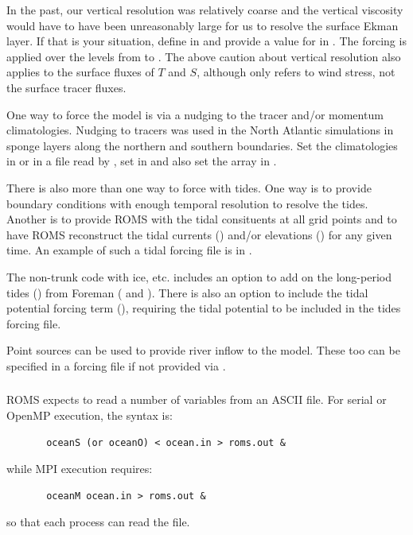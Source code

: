 In the past, our vertical resolution was relatively coarse and the
vertical viscosity would have to have been unreasonably large for
us to resolve the surface Ekman layer.  If that is your situation,
define  in  and provide a value for
 in .  The forcing is applied over the
levels from  to .  The above caution about
vertical resolution also applies to the surface fluxes of $T$ and
$S$, although  only refers to wind stress, not the
surface tracer fluxes.

\smallskip
{}

One way to force the model is via a nudging to the tracer and/or
momentum climatologies. Nudging to tracers was used in the North
Atlantic simulations in sponge layers along the northern and southern
boundaries. Set the climatologies in  or in a
file read by , set  in
 and also set the array  in
.

\smallskip
{}

There is also more than one way to force with tides. One way is to
provide boundary conditions with enough temporal resolution to
resolve the tides. Another is to provide ROMS with the tidal
consituents at all grid points and to have ROMS reconstruct the
tidal currents ()  and/or elevations ()
for any given time. An example of such a tidal forcing file is in
.

The non-trunk code with ice, etc. includes an option to
add on the long-period tides () from Foreman
(\cite{Foreman_96a} and \cite{Foreman_96b}). There is also an option to include the tidal potential
forcing term (), requiring the tidal potential to
be included in the tides forcing file.

\smallskip
{}

Point sources can be used to provide river inflow to the model.
These too can be specified in a forcing file if not provided via
.

\subsubsection{}
\label{ASCII_in}
ROMS expects to read a number of variables from an ASCII file.
For serial or OpenMP execution, the syntax is:
\begin{verbatim}
       oceanS (or oceanO) < ocean.in > roms.out &
\end{verbatim}
while MPI execution requires:
\begin{verbatim}
       oceanM ocean.in > roms.out &
\end{verbatim}
so that each process can read the file.

